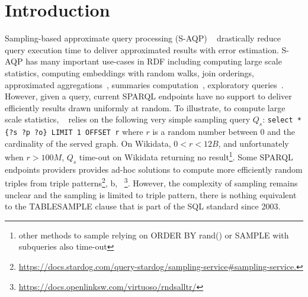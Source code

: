 
\section{Introduction}

Sampling-based approximate query processing (S-AQP)
~\cite{DBLP:conf/sigmod/AgarwalMKTJMMS14} drastically reduce query
execution time to deliver approximated results with error
estimation. S-AQP has many important use-cases in RDF including
computing large scale
statistics\cite{soulet2019anytime,10.1007/978-3-319-18818-8_14},
computing embeddings with random walks\cite{ristoski2016rdf2vec}, join
orderings\cite{DBLP:conf/cidr/LeisRGK017}, approximated
aggregations~\cite{DBLP:journals/tods/LiWYZ19}, summaries
computation~\cite{10.1007/978-3-030-49461-2_10}, exploratory
queries~\cite{DBLP:conf/sigmod/AgarwalMKTJMMS14}.  However, given a
query, current SPARQL endpoints have no support to deliver efficiently
results drawn uniformly at random. To illustrate, to compute large
scale statistics, ~\cite{soulet2019anytime} relies on the following
very simple sampling query $Q_s$:
%
\verb+select * {?s ?p ?o} LIMIT 1 OFFSET r+
%
where $r$ is a random number between 0 and the cardinality of the
served graph. On Wikidata, $0<r<12B$, and unfortunately when $r>100M$,
$Q_s$ time-out on Wikidata returning no result\footnote{other methods
  to sample relying on ORDER BY rand() or SAMPLE with subqueries also
  time-out}. Some SPARQL endpoints providers provides ad-hoc solutions
to compute more efficiently random triples from triple
patterns\footnote{\url{https://docs.stardog.com/query-stardog/sampling-service\#sampling-service.}},
b,
~\footnote{\url{https://docs.openlinksw.com/virtuoso/rndsalltr/}}. However,
the complexity of sampling remains unclear and the sampling is limited
to triple pattern, there is nothing equivalent to the TABLESAMPLE
clause that is part of the SQL standard since 2003.


